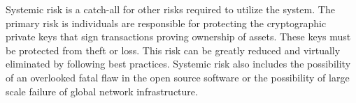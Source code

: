 Systemic risk is a catch-all for other risks required to utilize the system.
The primary risk is individuals are responsible for protecting the
cryptographic private keys that sign transactions proving ownership of assets.
These keys must be protected from theft or loss. This risk can be greatly
reduced and virtually eliminated by following best practices. Systemic risk
also includes the possibility of an overlooked fatal flaw in the open source
software or the possibility of large scale failure of global network
infrastructure.
